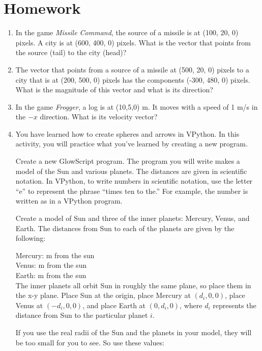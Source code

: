 \newpage

\section*{Homework}

\begin{enumerate}
	\item In the game \emph{Missile Command}, the source of a missile is at (100, 20, 0) pixels. A city is at (600, 400, 0) pixels. What is the vector that points from the source (tail) to the city (head)?
	\item The vector that points from a source of a missile at (500, 20, 0) pixels to a city that is at (200, 500, 0) pixels has the components (-300, 480, 0) pixels. What is the magnitude of this vector and what is its direction?
	\item In the game \emph{Frogger}, a log is at (10,5,0) m. It moves with a speed of 1 m/s in the $-x$ direction. What is its velocity vector?
	\item You have learned how to create spheres and arrows in VPython. In this activity, you will practice what you've learned by creating a new program.

Create a new GlowScript program. The program you will write makes a model of the Sun and various planets.  The distances are given in scientific notation.  In VPython, to write numbers in scientific notation, use the letter ``e'' to represent the phrase ``times ten to the.''  For example, the number  is written as  in a VPython program.

Create a model of Sun and three of the inner planets:  Mercury, Venus, and Earth.  The distances from Sun to each of the planets are given by the following:

Mercury:  m from the sun\\
Venus:  m from the sun\\
Earth:   m from the sun\\

The inner planets all orbit Sun in roughly the same plane, so place them in the x-y plane.  Place Sun at the origin, place Mercury at $(d_i , 0, 0)$, place Venus at $( -d_i, 0, 0)$, and place Earth at $(0, d_i, 0)$, where $d_i$ represents the distance from Sun to the particular planet $i$.

If you use the real radii of the Sun and the planets in your model, they will be too small for you to see.  So use these values:\\


\end{enumerate}
